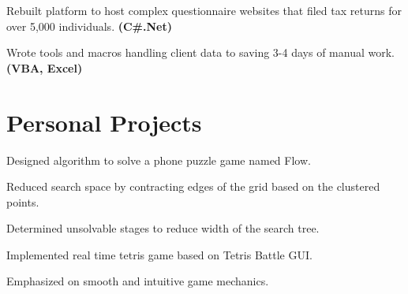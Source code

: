 \documentclass[letterpaper]{kevin-resume} %
\begin{document}
\begin{minipage}[t]{0.63\textwidth}
\sectionspace %


\begin{tightitemize}
	\item Rebuilt platform to host complex questionnaire websites that filed tax returns for over 5,000 individuals. \textbf{(C\#.Net)}
	\item Wrote tools and macros handling client data to saving 3-4 days of manual work. \textbf{(VBA, Excel)}
\end{tightitemize}

\sectionspace %


\sectionspace %

\section{Personal Projects}

\begin{tightitemize}
	\item Designed algorithm to solve a phone puzzle game named Flow.
 	\item Reduced search space by contracting edges of the grid based on the clustered points.
 	\item Determined unsolvable stages to reduce width of the search tree.
\end{tightitemize}

\sectionspace %


\begin{tightitemize}
	\item Implemented real time tetris game based on Tetris Battle GUI.
	\item Emphasized on smooth and intuitive game mechanics.
\end{tightitemize}

\sectionspace %


\end{minipage} %
\end{document}
